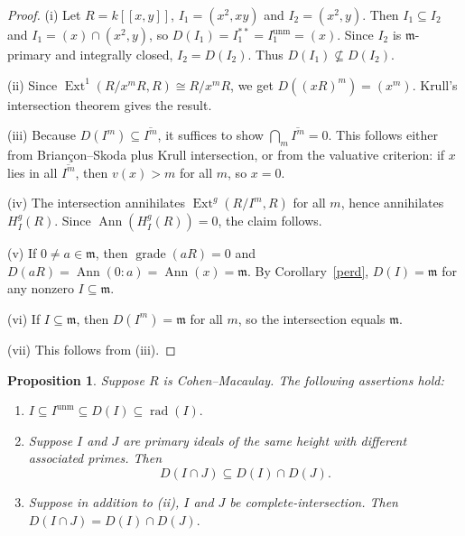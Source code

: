 \documentclass[11pt,a4paper]{amsart}
\numberwithin{equation}{section}
\newtheorem{proposition}[theorem]{Proposition}
\DeclareMathOperator{\grade}{grade}
\DeclareMathOperator{\Ann}{Ann}\DeclareMathOperator{\ann}{Ann}
\DeclareMathOperator{\unm}{unm}
\DeclareMathOperator{\rad}{rad}
\DeclareMathOperator{\Ext}{Ext}
\newcommand{\fm}{\mathfrak{m}}
\begin{document}
\begin{proof}
	(i) Let $R=k[[x,y]]$, $I_1=(x^2,xy)$ and $I_2=(x^2,y)$. Then $I_1\subseteq I_2$ and
	$I_1=(x)\cap(x^2,y)$, so $D(I_1)=I_1^{**}=I_1^{\unm}=(x)$. Since $I_2$ is $\fm$-primary and integrally closed,
	$I_2=D(I_2)$. Thus $D(I_1)\nsubseteq D(I_2)$.
	
	(ii) Since $\Ext^1(R/x^mR,R)\cong R/x^mR$, we get $D((xR)^m)=(x^m)$. Krull's intersection theorem gives the result.
	
	(iii) Because $D(I^m)\subseteq \overline{I^m}$, it suffices to show $\bigcap_m \overline{I^m}=0$. This follows either from Briançon–Skoda plus Krull intersection, or from the valuative criterion: if $x$ lies in all $\overline{I^m}$, then $v(x)>m$ for all $m$, so $x=0$.
	
	(iv) The intersection annihilates $\Ext^g(R/I^m,R)$ for all $m$, hence annihilates $H^g_I(R)$. Since $\Ann(H^g_I(R))=0$, the claim follows.
	
	(v) If $0\ne a\in\fm$, then $\grade(aR)=0$ and
	$D(aR)=\Ann(0:a)=\Ann(x)=\fm$. By Corollary~\ref{perd}, $D(I)=\fm$ for any nonzero $I\subseteq\fm$.
	
	(vi) If $I\subseteq\fm$, then $D(I^m)=\fm$ for all $m$, so the intersection equals $\fm$.
	
	(vii) This follows from (iii).
\end{proof}
\begin{proposition}\label{dd} 
	Suppose $R$ is Cohen--Macaulay. The following assertions hold:
	\begin{enumerate}
		\item[(i)] 
		\(
		I \subseteq I^{\unm} \subseteq D(I) \subseteq \rad(I).
		\)
		\item[(ii)]
		Suppose $I$ and $J$ are primary ideals of the same height with different associated primes. Then
		\[
		D(I \cap J) \subseteq D(I) \cap D(J).
		\]
	\item[(iii)] Suppose in addition  to (ii), $I$ and $J$ be	complete-intersection. Then \(
	D(I \cap J ) = D(I) \cap D(J ).
	\)\end{enumerate}
\end{proposition}
\end{document}
